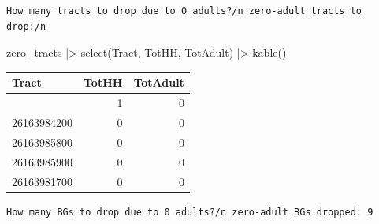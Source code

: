 \documentclass[
  11pt,
]{article}
\newenvironment{Shaded}{\begin{snugshade}}{\end{snugshade}}
\newcommand{\CommentTok}[1]{\textcolor[rgb]{0.37,0.37,0.37}{#1}}
\newcommand{\DecValTok}[1]{\textcolor[rgb]{0.68,0.00,0.00}{#1}}
\newcommand{\FunctionTok}[1]{\textcolor[rgb]{0.28,0.35,0.67}{#1}}
\newcommand{\NormalTok}[1]{\textcolor[rgb]{0.00,0.23,0.31}{#1}}
\newcommand{\OtherTok}[1]{\textcolor[rgb]{0.00,0.23,0.31}{#1}}
\newcommand{\SpecialCharTok}[1]{\textcolor[rgb]{0.37,0.37,0.37}{#1}}
\newcommand{\StringTok}[1]{\textcolor[rgb]{0.13,0.47,0.30}{#1}}
\begin{document}
\begin{verbatim}
How many tracts to drop due to 0 adults?/n zero-adult tracts to drop:/n
\end{verbatim}

\begin{Shaded}
\begin{Highlighting}[]
\NormalTok{zero\_tracts }\SpecialCharTok{|\textgreater{}} \FunctionTok{select}\NormalTok{(Tract, TotHH, TotAdult) }\SpecialCharTok{|\textgreater{}} \FunctionTok{kable}\NormalTok{()}
\end{Highlighting}
\end{Shaded}

\begin{longtable}[]{@{}lrr@{}}
\toprule\noalign{}
Tract & TotHH & TotAdult \\
\midrule\noalign{}
\endhead
\bottomrule\noalign{}
\endlastfoot
26163981800 & 1 & 0 \\
26163984200 & 0 & 0 \\
26163985800 & 0 & 0 \\
26163985900 & 0 & 0 \\
26163981700 & 0 & 0 \\
\end{longtable}

\begin{Shaded}
\end{Shaded}

\begin{verbatim}
How many BGs to drop due to 0 adults?/n zero-adult BGs dropped: 9 
\end{verbatim}
\end{document}
